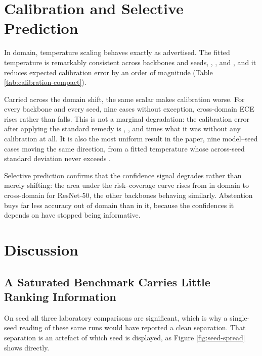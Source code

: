 \documentclass[runningheads]{llncs}
\begin{document}
\section{Calibration and Selective Prediction}
\label{sec:calibration}

In domain, temperature scaling behaves exactly as advertised. The fitted
temperature is remarkably consistent across backbones and seeds, \TempPvRn{},
\TempPvEb{}, and \TempPvMn{}, and it reduces expected calibration error by an
order of magnitude (Table \ref{tab:calibration-compact}).



Carried across the domain shift, the same scalar makes calibration worse. For
every backbone and every seed, nine cases without exception, cross-domain ECE
rises rather than falls. This is not a marginal degradation: the calibration
error after applying the standard remedy is \EceRatioRn{}, \EceRatioEb{}, and
\EceRatioMn{} times what it was without any calibration at all. It is also the
most uniform result in the paper, nine model--seed cases moving the same
direction, from a fitted temperature whose across-seed standard deviation never
exceeds \TempSdMax{}.

Selective prediction confirms that the confidence signal degrades rather than
merely shifting: the area under the risk--coverage curve rises from
\AurcPvInRn{} in domain to \AurcXdRn{} cross-domain for ResNet-50, the other
backbones behaving similarly. Abstention buys far less accuracy out of domain
than in it, because the confidences it depends on have stopped being
informative.

\section{Discussion}

\subsection{A Saturated Benchmark Carries Little Ranking Information}

On seed \SigSeed{} all three laboratory comparisons are significant, which is why
a single-seed reading of these same runs would have reported a clean separation.
That separation is an artefact of which seed is displayed, as Figure
\ref{fig:seed-spread} shows directly.
\end{document}
